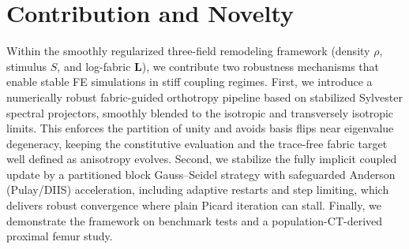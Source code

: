 \section*{Contribution and Novelty}
\label{sec:contribution-novelty}
Within the smoothly regularized three-field remodeling framework (density $\rho$, stimulus $S$, and log-fabric $\mathbf{L}$), we contribute two robustness mechanisms that enable stable FE simulations in stiff coupling regimes. First, we introduce a numerically robust fabric-guided orthotropy pipeline based on stabilized Sylvester spectral projectors, smoothly blended to the isotropic and transversely isotropic limits. This enforces the partition of unity and avoids basis flips near eigenvalue degeneracy, keeping the constitutive evaluation and the trace-free fabric target well defined as anisotropy evolves.
Second, we stabilize the fully implicit coupled update by a partitioned block Gauss--Seidel strategy with safeguarded Anderson (Pulay/DIIS) acceleration, including adaptive restarts and step limiting, which delivers robust convergence where plain Picard iteration can stall.  Finally, we demonstrate the framework on benchmark tests and a population-CT-derived proximal femur study.
